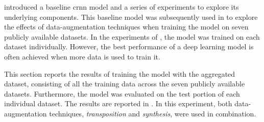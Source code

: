
 introduced a baseline \gls{crnn}
model and a series of experiments to explore its underlying
components. This baseline model was subsequently used in
 to explore the effects of
data-augmentation techniques when training the model on
seven publicly available datasets. In the experiments of
, the model was trained on
each dataset individually. However, the best performance of
a deep learning model is often achieved when more data is
used to train it.

This section reports the results of training the model with
the aggregated dataset, consisting of all the training data
across the seven publicly available datasets. Furthermore,
the model was evaluated on the test portion of each
individual dataset. The results are reported in
. In this experiment, both
data-augmentation techniques, \emph{transposition} and
\emph{synthesis}, were used in combination. 

